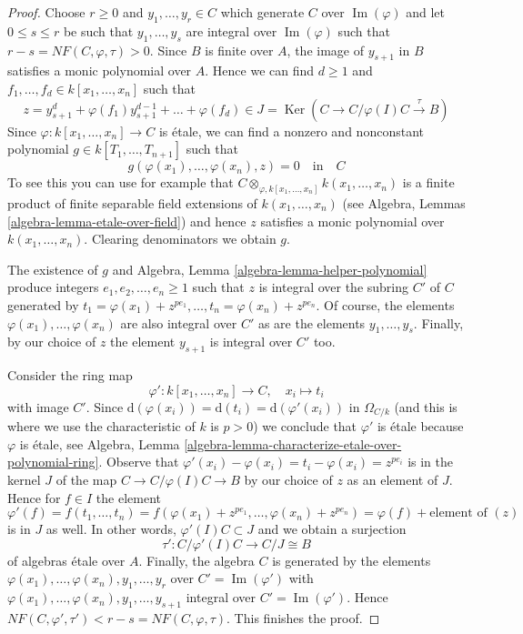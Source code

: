 \documentclass{stacks-project}
\theoremstyle{plain}
\theoremstyle{definition}
\theoremstyle{remark}
\numberwithin{equation}{subsection}
\def\Ker{\mathop{\mathrm{Ker}}}
\def\Im{\mathop{\mathrm{Im}}}
\begin{document}
\begin{proof}
Choose $r \geq 0$ and $y_1, \ldots, y_r \in C$ which generate
$C$ over $\Im(\varphi)$ and let $0 \leq s \leq r$ be such that
$y_1, \ldots, y_s$ are integral over $\Im(\varphi)$
such that $r - s = NF(C, \varphi, \tau) > 0$.
Since $B$ is finite over $A$, the image of $y_{s + 1}$ in $B$
satisfies a monic polynomial over $A$. Hence we can find
$d \geq 1$ and $f_1, \ldots, f_d \in k[x_1, \ldots, x_n]$
such that
$$
z = y_{s + 1}^d + \varphi(f_1) y_{s + 1}^{d - 1} + \ldots + \varphi(f_d) \in
J = \Ker(C \to C/\varphi(I)C \xrightarrow{\tau} B)
$$
Since $\varphi : k[x_1, \ldots, x_n] \to C$ is \'etale, we can find a
nonzero and nonconstant polynomial $g \in k[T_1, \ldots, T_{n + 1}]$
such that
$$
g(\varphi(x_1), \ldots, \varphi(x_n), z) = 0
\quad\text{in}\quad
C
$$
To see this you can use for example that
$C \otimes_{\varphi, k[x_1, \ldots, x_n]} k(x_1, \ldots, x_n)$
is a finite product of finite separable field extensions
of $k(x_1, \ldots, x_n)$
(see Algebra, Lemmas \ref{algebra-lemma-etale-over-field})
and hence $z$ satisfies a monic
polynomial over $k(x_1, \ldots, x_n)$. Clearing denominators
we obtain $g$.

\medskip\noindent
The existence of $g$ and
Algebra, Lemma \ref{algebra-lemma-helper-polynomial}
produce integers $e_1, e_2, \ldots, e_n \geq 1$ such that
$z$ is integral over the subring $C'$ of $C$ generated by
$t_1 = \varphi(x_1) + z^{pe_1}, \ldots, t_n = \varphi(x_n) + z^{pe_n}$.
Of course, the elements $\varphi(x_1), \ldots, \varphi(x_n)$
are also integral over $C'$ as are the elements
$y_1, \ldots, y_s$. Finally, by our choice of $z$ the element
$y_{s + 1}$ is integral over $C'$ too.

\medskip\noindent
Consider the ring map
$$
\varphi' : k[x_1, \ldots, x_n] \longrightarrow C, \quad
x_i \longmapsto t_i
$$
with image $C'$. Since
$\text{d}(\varphi(x_i)) = \text{d}(t_i) = \text{d}(\varphi'(x_i))$
in $\Omega_{C/k}$ (and this is where we use the characteristic of $k$
is $p > 0$) we conclude that $\varphi'$ is \'etale because $\varphi$ is
\'etale, see
Algebra, Lemma \ref{algebra-lemma-characterize-etale-over-polynomial-ring}.
Observe that $\varphi'(x_i) - \varphi(x_i) = t_i - \varphi(x_i) = z^{pe_i}$
is in the kernel $J$ of the map $C \to C/\varphi(I)C \to B$ by our
choice of $z$ as an element of $J$.
Hence for $f \in I$ the element
$$
\varphi'(f) =
f(t_1, \ldots, t_n) =
f(\varphi(x_1) + z^{pe_1}, \ldots, \varphi(x_n) + z^{pe_n}) =
\varphi(f) + \text{element of }(z)
$$
is in $J$ as well. In other words, $\varphi'(I)C \subset J$ and
we obtain a surjection
$$
\tau' : C/\varphi'(I)C \longrightarrow C/J \cong B
$$
of algebras \'etale over $A$. Finally, the algebra
$C$ is generated by the elements
$\varphi(x_1), \ldots, \varphi(x_n), y_1, \ldots, y_r$
over $C' = \Im(\varphi')$ with
$\varphi(x_1), \ldots, \varphi(x_n), y_1, \ldots, y_{s + 1}$
integral over $C' = \Im(\varphi')$. Hence
$NF(C, \varphi', \tau') < r - s = NF(C, \varphi, \tau)$.
This finishes the proof.
\end{proof}
\end{document}
